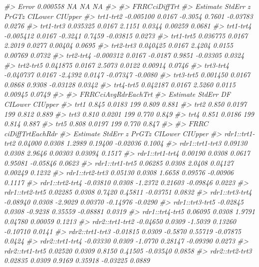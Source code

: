 \documentclass[
]{book}
\newenvironment{Shaded}{\begin{snugshade}}{\end{snugshade}}
\newcommand{\CommentTok}[1]{\textcolor[rgb]{0.56,0.35,0.01}{\textit{#1}}}
\begin{document}
\begin{Shaded}
\begin{Highlighting}[]
\CommentTok{#> Error     0.000558    NA NA      NA}
\CommentTok{#> }
\CommentTok{#> $FRRC$ciDiffTrt}
\CommentTok{#>            Estimate StdErr       z  PrGTz  CILower CIUpper}
\CommentTok{#> trt1-trt2 -0.005100 0.0167 -0.3054 0.7601 -0.03783  0.0276}
\CommentTok{#> trt1-trt3  0.035325 0.0167  2.1151 0.0344  0.00259  0.0681}
\CommentTok{#> trt1-trt4 -0.005412 0.0167 -0.3241 0.7459 -0.03815  0.0273}
\CommentTok{#> trt1-trt5  0.036775 0.0167  2.2019 0.0277  0.00404  0.0695}
\CommentTok{#> trt2-trt3  0.040425 0.0167  2.4204 0.0155  0.00769  0.0732}
\CommentTok{#> trt2-trt4 -0.000312 0.0167 -0.0187 0.9851 -0.03305  0.0324}
\CommentTok{#> trt2-trt5  0.041875 0.0167  2.5073 0.0122  0.00914  0.0746}
\CommentTok{#> trt3-trt4 -0.040737 0.0167 -2.4392 0.0147 -0.07347 -0.0080}
\CommentTok{#> trt3-trt5  0.001450 0.0167  0.0868 0.9308 -0.03128  0.0342}
\CommentTok{#> trt4-trt5  0.042187 0.0167  2.5260 0.0115  0.00945  0.0749}
\CommentTok{#> }
\CommentTok{#> $FRRC$ciAvgRdrEachTrt}
\CommentTok{#>      Estimate StdErr  DF CILower CIUpper}
\CommentTok{#> trt1    0.845 0.0183 199   0.809   0.881}
\CommentTok{#> trt2    0.850 0.0197 199   0.812   0.889}
\CommentTok{#> trt3    0.810 0.0201 199   0.770   0.849}
\CommentTok{#> trt4    0.851 0.0186 199   0.814   0.887}
\CommentTok{#> trt5    0.808 0.0197 199   0.770   0.847}
\CommentTok{#> }
\CommentTok{#> $FRRC$ciDiffTrtEachRdr}
\CommentTok{#>                 Estimate StdErr       z   PrGTz  CILower CIUpper}
\CommentTok{#> rdr1::trt1-trt2  0.04000 0.0308  1.2989 0.19400 -0.02036  0.1004}
\CommentTok{#> rdr1::trt1-trt3  0.09130 0.0308  2.9646 0.00303  0.03094  0.1517}
\CommentTok{#> rdr1::trt1-trt4  0.00190 0.0308  0.0617 0.95081 -0.05846  0.0623}
\CommentTok{#> rdr1::trt1-trt5  0.06285 0.0308  2.0408 0.04127  0.00249  0.1232}
\CommentTok{#> rdr1::trt2-trt3  0.05130 0.0308  1.6658 0.09576 -0.00906  0.1117}
\CommentTok{#> rdr1::trt2-trt4 -0.03810 0.0308 -1.2372 0.21603 -0.09846  0.0223}
\CommentTok{#> rdr1::trt2-trt5  0.02285 0.0308  0.7420 0.45811 -0.03751  0.0832}
\CommentTok{#> rdr1::trt3-trt4 -0.08940 0.0308 -2.9029 0.00370 -0.14976 -0.0290}
\CommentTok{#> rdr1::trt3-trt5 -0.02845 0.0308 -0.9238 0.35559 -0.08881  0.0319}
\CommentTok{#> rdr1::trt4-trt5  0.06095 0.0308  1.9791 0.04780  0.00059  0.1213}
\CommentTok{#> rdr2::trt1-trt2 -0.04650 0.0309 -1.5039 0.13260 -0.10710  0.0141}
\CommentTok{#> rdr2::trt1-trt3 -0.01815 0.0309 -0.5870 0.55719 -0.07875  0.0424}
\CommentTok{#> rdr2::trt1-trt4 -0.03330 0.0309 -1.0770 0.28147 -0.09390  0.0273}
\CommentTok{#> rdr2::trt1-trt5  0.02520 0.0309  0.8150 0.41505 -0.03540  0.0858}
\CommentTok{#> rdr2::trt2-trt3  0.02835 0.0309  0.9169 0.35918 -0.03225  0.0889}

\end{Highlighting}
\end{Shaded}
\end{document}
